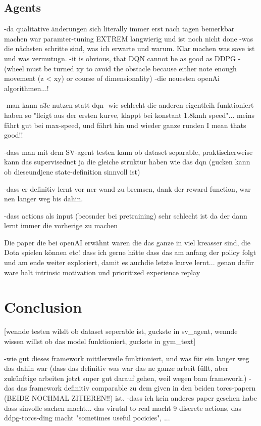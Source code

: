 \section{Agents}

-da qualitative änderungen sich literally immer erst nach tagen bemerkbar machen war paramter-tuning EXTREM langwierig und ist noch nicht done
-was die nächsten schritte sind, was ich erwarte und warum. Klar machen was save ist und was vermutugn.
-it is obvious, that DQN cannot be as good as DDPG - (wheel must be turned xy to avoid the obstacle because either note enough movement (z < xy) or course of dimensionality)
-die neuesten openAi algorithmen...!

-man kann a3c nutzen statt dqn
-wie schlecht die anderen eigentlcih funktioniert haben so "fleigt aus der ersten kurve, klappt bei konstant 1.8kmh speed"... meins fährt gut bei max-speed, und fährt hin und wieder ganze runden I mean thats good!!

-dass man mit dem SV-agent testen kann ob dataset separable, praktischerweise kann das supervisednet ja die gleiche struktur haben wie das dqn (gucken kann ob dieseundjene state-definition sinnvoll ist)

-dass er definitiv lernt vor ner wand zu bremsen, dank der reward function, war nen langer weg bis dahin.

-dass actions als input (beosnder bei pretraining) sehr schlecht ist da der dann lernt immer die vorherige zu machen

Die paper die bei openAI erwähnt waren die das ganze in viel kreasser sind, die Dota spielen können etc!
dass ich gerne hätte dass das am anfang der policy folgt und am ende weiter exploriert, damit es auchdie letzte kurve lernt... genau dafür ware halt intrinsic motivation und prioritized experience replay

\chapter{Conclusion}


[wennde testen wilslt ob dataset seperable ist, guckste in sv\_agent, wennde wissen willst ob das model funktioniert, guckste in gym\_text]


-wie gut dieses framework mittlerweile funktioniert, und was für ein langer weg das dahin war (dass das definitiv was war das ne ganze arbeit füllt, aber zukünftige arbeiten jetzt super gut darauf gehen, weil wegen bam framework.)
-das das framework definitiv comparable zu dem given in den beiden torcs-papern (BEIDE NOCHMAL ZITIEREN!!) ist.
-dass ich kein anderes paper gesehen habe dass sinvolle sachen macht... das virutal to real macht 9 discrete actions, das ddpg-torcs-ding macht "sometimes useful pocicies", ...

